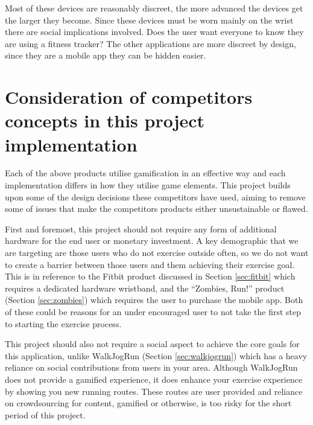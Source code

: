 Most of these devices are reasonably discreet, the more advanced the
devices get the larger they become. Since these devices must be worn
mainly on the wrist there are social implications involved. Does the
user want everyone to know they are using a fitness tracker? The other
applications are more discreet by design, since they are a mobile app
they can be hidden easier. 

\section{Consideration of competitors concepts in this project
  implementation}
\label{sec:consideration}
Each of the above products utilise gamification in an effective way
and each implementation differs in how they utilise game
elements. This project builds upon some of the design decisions these
competitors have used, aiming to remove some of issues that make the
competitors products either unsustainable or flawed.

First and foremost, this project should not require any form of
additional hardware for the end user or monetary investment. A key
demographic that we are targeting are those users who do not exercise
outside often, so we do not want to create a barrier between those
users and them achieving their exercise goal. This is in reference to
the Fitbit product discussed in Section \ref{sec:fitbit} which
requires a dedicated hardware wristband, and the ``Zombies, Run!'' product
(Section \ref{sec:zombies}) which requires the user to purchase the
mobile app. Both of these could be reasons for an under encouraged
user to not take the first step to starting the exercise process.

This project should also not require a social aspect to achieve the
core goals for this application, unlike WalkJogRun (Section
\ref{sec:walkjogrun}) which has a heavy reliance on social
contributions from users in your area. Although WalkJogRun does not
provide a gamified experience, it does enhance your exercise
experience by showing you new running routes. These routes are user
provided and reliance on crowdsourcing for content, gamified or
otherwise, is too risky for the short period of this project. 








